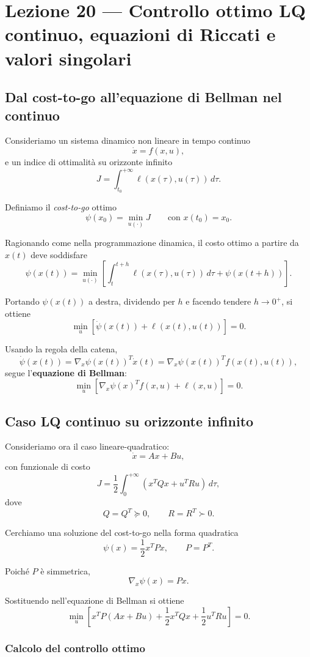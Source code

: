 \chapter{Lezione 20 --- Controllo ottimo LQ continuo, equazioni di Riccati e valori singolari}

\section{Dal cost-to-go all'equazione di Bellman nel continuo}

Consideriamo un sistema dinamico non lineare in tempo continuo
\[
\dot x = f(x,u),
\]
e un indice di ottimalità su orizzonte infinito
\[
J=\int_{t_0}^{+\infty}\ell(x(\tau),u(\tau))\,d\tau.
\]

Definiamo il \emph{cost-to-go} ottimo
\[
\psi(x_0)=\min_{u(\cdot)} J
\qquad\text{con } x(t_0)=x_0.
\]

Ragionando come nella programmazione dinamica, il costo ottimo a partire da \(x(t)\) deve soddisfare
\[
\psi(x(t))
=
\min_{u(\cdot)}
\left[
\int_t^{t+h}\ell(x(\tau),u(\tau))\,d\tau
+
\psi(x(t+h))
\right].
\]

Portando \(\psi(x(t))\) a destra, dividendo per \(h\) e facendo tendere \(h\to 0^+\), si ottiene
\[
\min_u\left[\dot\psi(x(t))+\ell(x(t),u(t))\right]=0.
\]

Usando la regola della catena,
\[
\dot\psi(x(t))
=
\nabla_x \psi(x(t))^T \dot x(t)
=
\nabla_x \psi(x(t))^T f(x(t),u(t)),
\]
segue l'\textbf{equazione di Bellman}:
\[
\boxed{
\min_u\left[\nabla_x\psi(x)^T f(x,u)+\ell(x,u)\right]=0.
}
\]

\section{Caso LQ continuo su orizzonte infinito}

Consideriamo ora il caso lineare-quadratico:
\[
\dot x = Ax+Bu,
\]
con funzionale di costo
\[
J=\frac12\int_0^{+\infty}\left(x^TQx+u^TRu\right)\,d\tau,
\]
dove
\[
Q=Q^T\succeq 0,
\qquad
R=R^T\succ 0.
\]

Cerchiamo una soluzione del cost-to-go nella forma quadratica
\[
\psi(x)=\frac12 x^T P x,
\qquad
P=P^T.
\]

Poiché \(P\) è simmetrica,
\[
\nabla_x\psi(x)=Px.
\]

Sostituendo nell'equazione di Bellman si ottiene
\[
\min_u
\left[
x^TP(Ax+Bu)+\frac12 x^TQx+\frac12 u^TRu
\right]=0.
\]

\subsection{Calcolo del controllo ottimo}

